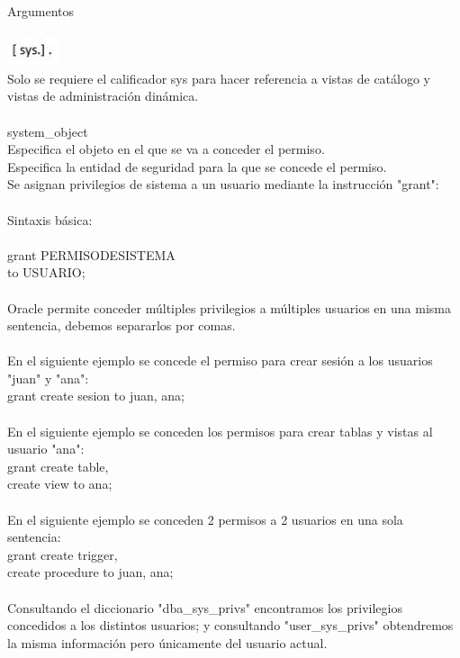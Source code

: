 Argumentos \\ \\
\includegraphics[width=1.5cm]{./Imagenes/sysc} \\ 
Solo se requiere el calificador sys para hacer referencia a vistas de catálogo y vistas de administración dinámica.\\ \\
system\_object\\
Especifica el objeto en el que se va a conceder el permiso.\\
Especifica la entidad de seguridad para la que se concede el permiso.\\
Se asignan privilegios de sistema a un usuario mediante la instrucción "grant":\\ \\
Sintaxis básica:\\ \\
grant PERMISODESISTEMA\\
to USUARIO;\\ \\
Oracle permite conceder múltiples privilegios a múltiples usuarios en una misma sentencia, debemos separarlos por comas.\\ \\
En el siguiente ejemplo se concede el permiso para crear sesión a los usuarios "juan" y "ana": \\
grant create sesion to juan, ana;\\ \\
En el siguiente ejemplo se conceden los permisos para crear tablas y vistas al usuario "ana":\\
grant create table, \\
create view
to ana;\\ \\
En el siguiente ejemplo se conceden 2 permisos a 2 usuarios en una sola sentencia:\\
grant create trigger,\\
create procedure to juan, ana;\\ \\
Consultando el diccionario "dba\_sys\_privs" encontramos los privilegios concedidos a los distintos usuarios; y consultando "user\_sys\_privs" obtendremos la misma información pero únicamente del usuario actual.

